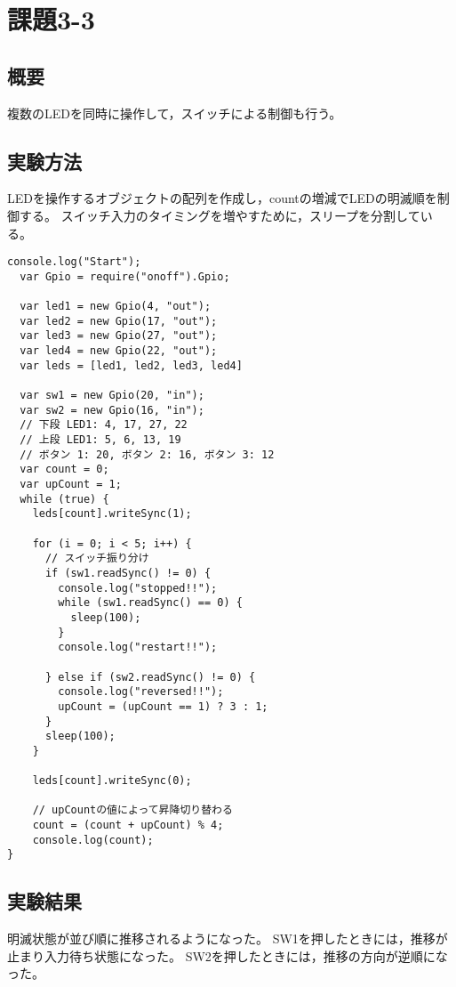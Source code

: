 \documentclass[a4paper,10pt]{jsarticle}
\begin{document}
\section{課題3-3}
\subsection{概要}
複数のLEDを同時に操作して，スイッチによる制御も行う。

\subsection{実験方法}
LEDを操作するオブジェクトの配列を作成し，countの増減でLEDの明滅順を制御する。
スイッチ入力のタイミングを増やすために，スリープを分割している。

\begin{lstlisting}[caption={program3-3},label={program3-3}]
  console.log("Start");
  var Gpio = require("onoff").Gpio;

  var led1 = new Gpio(4, "out");
  var led2 = new Gpio(17, "out");
  var led3 = new Gpio(27, "out");
  var led4 = new Gpio(22, "out");
  var leds = [led1, led2, led3, led4]

  var sw1 = new Gpio(20, "in");
  var sw2 = new Gpio(16, "in");
  // 下段 LED1: 4, 17, 27, 22
  // 上段 LED1: 5, 6, 13, 19
  // ボタン 1: 20, ボタン 2: 16, ボタン 3: 12
  var count = 0;
  var upCount = 1;
  while (true) {
    leds[count].writeSync(1);

    for (i = 0; i < 5; i++) {
      // スイッチ振り分け
      if (sw1.readSync() != 0) {
        console.log("stopped!!");
        while (sw1.readSync() == 0) {
          sleep(100);
        }
        console.log("restart!!");

      } else if (sw2.readSync() != 0) {
        console.log("reversed!!");
        upCount = (upCount == 1) ? 3 : 1;
      }
      sleep(100);
    }

    leds[count].writeSync(0);

    // upCountの値によって昇降切り替わる
    count = (count + upCount) % 4;
    console.log(count);
}
\end{lstlisting}

\subsection{実験結果}
明滅状態が並び順に推移されるようになった。
SW1を押したときには，推移が止まり入力待ち状態になった。
SW2を押したときには，推移の方向が逆順になった。
\end{document}
